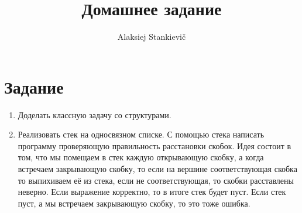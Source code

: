 \documentclass[12pt]{article}
\author{Alaksiej Stankievič}
\title{Домашнее задание}
\begin{document}

\section{Задание}


\begin{enumerate}
 \item Доделать классную задачу со структурами.
 \item Реализовать стек на односвязном списке. С помощью стека написать программу проверяющую правильность расстановки скобок. Идея состоит в том, что мы помещаем в стек каждую открывающую скобку, а когда встречаем закрывающую скобку, то если на вершине соответствующая скобка то выпихиваем её из стека, если не соответствующая, то скобки расставлены неверно. Если выражение корректно, то в итоге стек будет пуст. Если стек пуст, а мы встречаем закрывающую скобку, то это тоже ошибка.
\end{enumerate}
\end{document}
